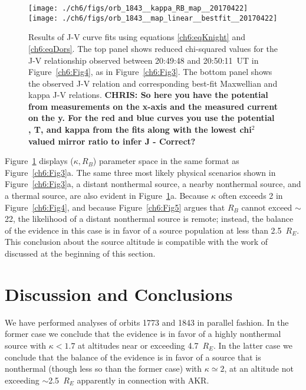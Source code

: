 
  \begin{figure}
    \centering
    \noindent\texttt{[image: ./ch6/figs/orb\_1843\_\_kappa\_RB\_map\_\_20170422]}
    \noindent\texttt{[image: ./ch6/figs/orb\_1843\_\_map\_linear\_\_bestfit\_\_20170422]}
    \caption[Orbit 1843: Reduced chi-squared values for observed J-V curves and
    corresponding best-fit J-V curves.]{Results of J-V curve fits using
      equations \ref{ch6:eqKnight} and \ref{ch6:eqDors}. The top panel shows
      reduced chi-squared values for the J-V relationship observed between
      20:49:48 and 20:50:11~UT in Figure~\ref{ch6:Fig4}, as in
      Figure~\ref{ch6:Fig3}. The bottom panel shows the observed J-V relation
      and corresponding best-fit Maxwellian and kappa J-V
      relations. \textbf{CHRIS: So here you have the potential from measurements
        on the x-axis and the measured current on the y. For the red and blue
        curves you use the potential , T, and kappa from the fits along with the
        lowest chi$^2$ valued mirror ratio to infer J - Correct? }}
    \label{ch6:Fig6}
  \end{figure}

  Figure~\ref{ch6:Fig6} displays ($\kappa, R_B$) parameter space in the same
  format as Figure~\ref{ch6:Fig3}a. The same three most likely physical
  scenarios shown in Figure~\ref{ch6:Fig3}a, a distant nonthermal source, a
  nearby nonthermal source, and a thermal source, are also evident in
  Figure~\ref{ch6:Fig6}a. Because $\kappa$ often exceeds 2 in
  Figure~\ref{ch6:Fig4}, and because Figure~\ref{ch6:Fig5} argues that $R_B$
  cannot exceed $\sim$22, the likelihood of a distant nonthermal source is
  remote; instead, the balance of the evidence in this case is in favor of a
  source population at less than 2.5~$R_E$. This conclusion about the source
  altitude is compatible with the work of \citet{Ergun1998} discussed at the
  beginning of this section.
  
  \section{Discussion and Conclusions}

  We have performed analyses of orbits 1773 and 1843 in parallel fashion. In the
  former case we conclude that the evidence is in favor of a highly nonthermal
  source with $\kappa < 1.7$ at altitudes near or exceeding 4.7~$R_E$. In the
  latter case we conclude that the balance of the evidence is in favor of a
  source that is nonthermal (though less so than the former case) with $\kappa
  \simeq 2$, at an altitude not exceeding $\sim$2.5~$R_E$ apparently in
  connection with AKR.

